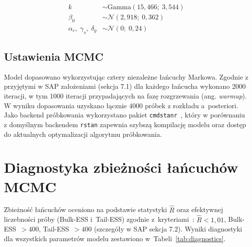 \documentclass[12pt, a4paper]{article}
\begin{document}
\begin{align}
    k       &\sim \mathrm{Gamma}(15{,}466;\;3{,}544) \\
    \beta_0 &\sim \mathcal{N}(2{,}918;\;0{,}362) \\
    \alpha_c,\;\gamma_s,\;\delta_g &\sim \mathcal{N}(0;\;0{,}24)
\end{align}

\subsection{Ustawienia MCMC}
Model dopasowano wykorzystując cztery niezależne łańcuchy Markowa. Zgodnie z przyjętymi w SAP założeniami (sekcja 7.1) dla każdego łańcucha wykonano 2000 iteracji, w tym 1000 iteracji przypadających na fazę rozgrzewania (ang. \textit{warmup}). W wyniku dopasowania uzyskano łącznie 4000 próbek z rozkładu a~posteriori. Jako backend próbkowania wykorzystano pakiet \texttt{cmdstanr}~\cite{cmdstanr}, który w porównaniu z domyślnym backendem \texttt{rstan} zapewnia szybszą kompilację modelu oraz dostęp do aktualnych optymalizacji algorytmu próbkowania.

\section{Diagnostyka zbieżności łańcuchów MCMC}

Zbieżność łańcuchów oceniono na podstawie statystyki $\hat{R}$ oraz efektywnej liczebności próby (Bulk-ESS i~Tail-ESS) zgodnie z~kryteriami~\cite{vehtari2019rhat}: $\hat{R} < 1{,}01$, Bulk-ESS~$> 400$, Tail-ESS~$> 400$ (szczegóły w SAP sekcja 7.2). Wyniki diagnostyki dla wszystkich parametrów modelu zestawiono w~Tabeli~\ref{tab:diagnostics}.
\end{document}
